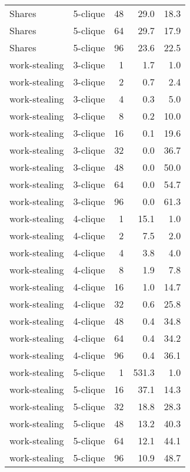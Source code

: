 \begin{longtable}{llr|rr}
        Shares &  5-clique &           48 &   29.0 &     18.3 \\
        Shares &  5-clique &           64 &   29.7 &     17.9 \\
        Shares &  5-clique &           96 &   23.6 &     22.5 \\
 work-stealing &  3-clique &            1 &    1.7 &      1.0 \\
 work-stealing &  3-clique &            2 &    0.7 &      2.4 \\
 work-stealing &  3-clique &            4 &    0.3 &      5.0 \\
 work-stealing &  3-clique &            8 &    0.2 &     10.0 \\
 work-stealing &  3-clique &           16 &    0.1 &     19.6 \\
 work-stealing &  3-clique &           32 &    0.0 &     36.7 \\
 work-stealing &  3-clique &           48 &    0.0 &     50.0 \\
 work-stealing &  3-clique &           64 &    0.0 &     54.7 \\
 work-stealing &  3-clique &           96 &    0.0 &     61.3 \\
 work-stealing &  4-clique &            1 &   15.1 &      1.0 \\
 work-stealing &  4-clique &            2 &    7.5 &      2.0 \\
 work-stealing &  4-clique &            4 &    3.8 &      4.0 \\
 work-stealing &  4-clique &            8 &    1.9 &      7.8 \\
 work-stealing &  4-clique &           16 &    1.0 &     14.7 \\
 work-stealing &  4-clique &           32 &    0.6 &     25.8 \\
 work-stealing &  4-clique &           48 &    0.4 &     34.8 \\
 work-stealing &  4-clique &           64 &    0.4 &     34.2 \\
 work-stealing &  4-clique &           96 &    0.4 &     36.1 \\
 work-stealing &  5-clique &            1 &  531.3 &      1.0 \\
 work-stealing &  5-clique &           16 &   37.1 &     14.3 \\
 work-stealing &  5-clique &           32 &   18.8 &     28.3 \\
 work-stealing &  5-clique &           48 &   13.2 &     40.3 \\
 work-stealing &  5-clique &           64 &   12.1 &     44.1 \\
 work-stealing &  5-clique &           96 &   10.9 &     48.7 \\
\end{longtable}
